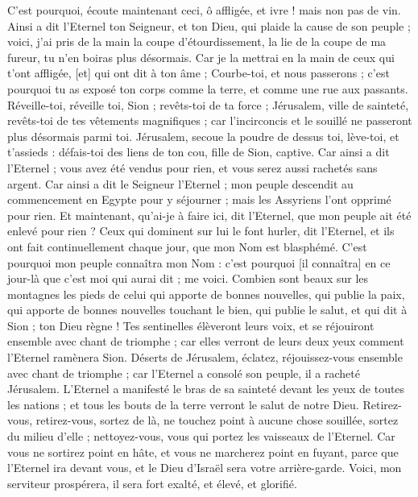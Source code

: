\begin{multicols}{2}
C'est pourquoi, écoute maintenant ceci, ô affligée, et ivre ! mais non pas de vin.
Ainsi a dit l'Eternel ton Seigneur, et ton Dieu, qui plaide la cause de son peuple ; voici, j'ai pris de la main la coupe d'étourdissement, la lie de la coupe de ma fureur, tu n'en boiras plus désormais.
Car je la mettrai en la main de ceux qui t'ont affligée, [et] qui ont dit à ton âme ; Courbe-toi, et nous passerons ; c'est pourquoi tu as exposé ton corps comme la terre, et comme une rue aux passants.
\VerseOne{}Réveille-toi, réveille toi, Sion ; revêts-toi de ta force ; Jérusalem, ville de sainteté, revêts-toi de tes vêtements magnifiques ; car l'incirconcis et le souillé ne passeront plus désormais parmi toi.
Jérusalem, secoue la poudre de dessus toi, lève-toi, et t'assieds : défais-toi des liens de ton cou, fille de Sion, captive.
Car ainsi a dit l'Eternel ; vous avez été vendus pour rien, et vous serez aussi rachetés sans argent.
Car ainsi a dit le Seigneur l'Eternel ; mon peuple descendit au commencement en Egypte pour y séjourner ; mais les Assyriens l'ont opprimé pour rien.
Et maintenant, qu'ai-je à faire ici, dit l'Eternel, que mon peuple ait été enlevé pour rien ? Ceux qui dominent sur lui le font hurler, dit l'Eternel, et ils ont fait continuellement chaque jour, que mon Nom est blasphémé.
C'est pourquoi mon peuple connaîtra mon Nom : c'est pourquoi [il connaîtra] en ce jour-là que c'est moi qui aurai dit ; me voici.
Combien sont beaux sur les montagnes les pieds de celui qui apporte de bonnes nouvelles, qui publie la paix, qui apporte de bonnes nouvelles touchant le bien, qui publie le salut, et qui dit à Sion ; ton Dieu règne !
Tes sentinelles élèveront leurs voix, et se réjouiront ensemble avec chant de triomphe ; car elles verront de leurs deux yeux comment l'Eternel ramènera Sion.
Déserts de Jérusalem, éclatez, réjouissez-vous ensemble avec chant de triomphe ; car l'Eternel a consolé son peuple, il a racheté Jérusalem.
L'Eternel a manifesté le bras de sa sainteté devant les yeux de toutes les nations ; et tous les bouts de la terre verront le salut de notre Dieu.
Retirez-vous, retirez-vous, sortez de là, ne touchez point à aucune chose souillée, sortez du milieu d'elle ; nettoyez-vous, vous qui portez les vaisseaux de l'Eternel.
Car vous ne sortirez point en hâte, et vous ne marcherez point en fuyant, parce que l'Eternel ira devant vous, et le Dieu d'Israël sera votre arrière-garde.
Voici, mon serviteur prospérera, il sera fort exalté, et élevé, et glorifié.

\end{multicols}
